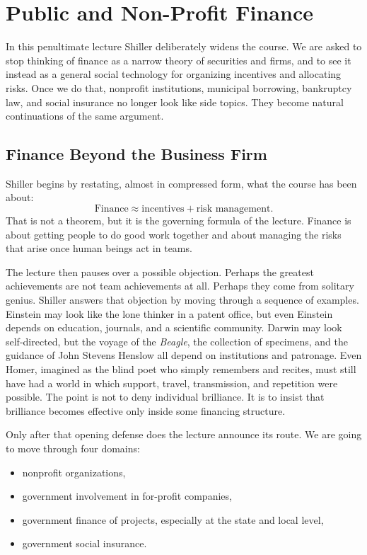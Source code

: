 \chapter{Public and Non-Profit Finance}

In this penultimate lecture Shiller deliberately widens the course. We are asked to stop thinking of finance as a narrow theory of securities and firms, and to see it instead as a general social technology for organizing incentives and allocating risks. Once we do that, nonprofit institutions, municipal borrowing, bankruptcy law, and social insurance no longer look like side topics. They become natural continuations of the same argument.

\section{Finance Beyond the Business Firm}

Shiller begins by restating, almost in compressed form, what the course has been about:
\begin{equation}
\text{Finance} \approx \text{incentives} + \text{risk management}.
\end{equation}
That is not a theorem, but it is the governing formula of the lecture. Finance is about getting people to do good work together and about managing the risks that arise once human beings act in teams.

The lecture then pauses over a possible objection. Perhaps the greatest achievements are not team achievements at all. Perhaps they come from solitary genius. Shiller answers that objection by moving through a sequence of examples. Einstein may look like the lone thinker in a patent office, but even Einstein depends on education, journals, and a scientific community. Darwin may look self-directed, but the voyage of the \emph{Beagle}, the collection of specimens, and the guidance of John Stevens Henslow all depend on institutions and patronage. Even Homer, imagined as the blind poet who simply remembers and recites, must still have had a world in which support, travel, transmission, and repetition were possible. The point is not to deny individual brilliance. It is to insist that brilliance becomes effective only inside some financing structure.

Only after that opening defense does the lecture announce its route. We are going to move through four domains:
\begin{itemize}
\item nonprofit organizations,
\item government involvement in for-profit companies,
\item government finance of projects, especially at the state and local level,
\item government social insurance.
\end{itemize}

